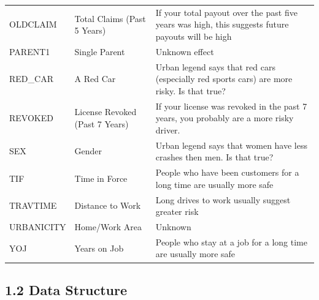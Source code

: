 \documentclass[]{article}
\begin{document}
\begin{table}[H]
{\begin{tabular}{lll}
OLDCLAIM & Total Claims (Past 5 Years) & If your total payout over the past five years was high, this suggests future payouts will be high\\
PARENT1 & Single Parent & Unknown effect\\
RED\_CAR & A Red Car & Urban legend says that red cars (especially red sports cars) are more risky. Is that true?\\
\addlinespace
REVOKED & License Revoked (Past 7 Years) & If your license was revoked in the past 7 years, you probably are a more risky driver.\\
SEX & Gender & Urban legend says that women have less crashes then men. Is that true?\\
TIF & Time in Force & People who have been customers for a long time are usually more safe\\
TRAVTIME & Distance to Work & Long drives to work usually suggest greater risk\\
URBANICITY & Home/Work Area & Unknown\\
YOJ & Years on Job & People who stay at a job for a long time are usually more safe\\
\bottomrule
\end{tabular}}
\end{table}

\subsection{1.2 Data Structure}\label{data-structure}
\end{document}
